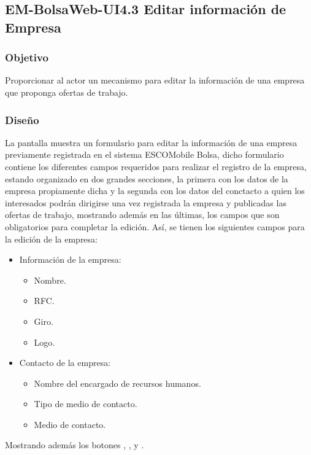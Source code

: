 \subsection{EM-BolsaWeb-UI4.3 Editar información de Empresa}

\subsubsection{Objetivo}
	\noindent
	Proporcionar al actor un mecanismo para editar la información de una empresa que proponga ofertas de trabajo.
\subsubsection{Diseño}
	\noindent
	La pantalla muestra un formulario para editar la información de una empresa previamente registrada en el sistema ESCOMobile Bolsa, dicho formulario contiene los diferentes campos requeridos para realizar el registro de la empresa, estando organizado en dos grandes secciones, la primera con los datos de la empresa propiamente dicha y la segunda con los datos del conctacto a quien los interesados podrán dirigirse una vez registrada la empresa y publicadas las ofertas de trabajo, mostrando además en las últimas, los campos que son obligatorios para completar la edición. Así, se tienen los siguientes campos para la edición de la empresa:
	\begin{itemize}
		\item Información de la empresa:
		\begin{itemize}
			\item Nombre.
			\item RFC.
			\item Giro.
			\item Logo.
		\end{itemize}
		\item Contacto de la empresa:
		\begin{itemize}
			\item Nombre del encargado de recursos humanos.
			\item Tipo de medio de contacto. 
			\item Medio de contacto. 
		\end{itemize}
	\end{itemize}
	Mostrando además los botones , \IUbutton{+},  y .


